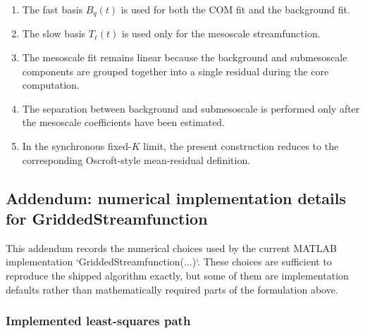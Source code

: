 \begin{enumerate}
    \item The fast basis $B_q(t)$ is used for both the COM fit and the background fit.
    \item The slow basis $T_\ell(t)$ is used only for the mesoscale streamfunction.
    \item The mesoscale fit remains linear because the background and submesoscale components
    are grouped together into a single residual during the core computation.
    \item The separation between background and submesoscale is performed only after the
    mesoscale coefficients have been estimated.
    \item In the synchronous fixed-$K$ limit, the present construction reduces to the
    corresponding Oscroft-style mean-residual definition.
\end{enumerate}

\subsection{Addendum: numerical implementation details for GriddedStreamfunction}

This addendum records the numerical choices used by the current MATLAB implementation
`GriddedStreamfunction(...)`. These choices are sufficient to
reproduce the shipped algorithm exactly, but some of them are implementation defaults rather
than mathematically required parts of the formulation above.

\subsubsection{Implemented least-squares path}

